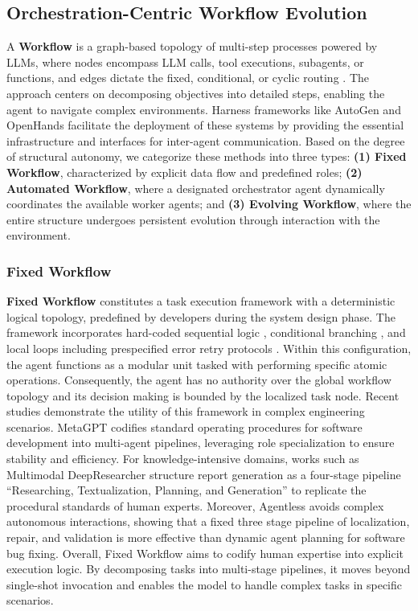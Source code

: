 \documentclass{llmxive}
\begin{document}
\subsection{Orchestration-Centric Workflow Evolution}
\label{sec:agent_evo_agentic_workflow_design}
A \textbf{Workflow} is a graph-based topology of multi-step processes powered by LLMs, where nodes encompass LLM calls, tool executions, subagents, or functions, and edges dictate the fixed, conditional, or cyclic routing \cite{ToT,ReAct,ReWoo,Self-Refine,LLM+P}. The approach centers on decomposing objectives into detailed steps, enabling the agent to navigate complex environments. Harness frameworks like AutoGen  \cite{autogen} and OpenHands \cite{OpenHands} facilitate the deployment of these systems by providing the essential infrastructure and interfaces for inter-agent communication. Based on the degree of structural autonomy, we categorize these methods into three types: \textbf{(1) Fixed Workflow}, characterized by explicit data flow and predefined roles; \textbf{(2) Automated Workflow}, where a designated orchestrator agent dynamically coordinates the available worker agents; and \textbf{(3) Evolving Workflow}, where the entire structure undergoes persistent evolution through interaction with the environment.

\subsubsection{Fixed Workflow}
\label{sec:fixed_workflow}
\textbf{Fixed Workflow} constitutes a task execution framework with a deterministic logical topology, predefined by developers during the system design phase. The framework incorporates hard-coded sequential logic \cite{Explorer, Simulate_Before_Act}, conditional branching \cite{CodeR, VideoAgent}, and local loops including prespecified error retry protocols \cite{LVAgent, QuantAgent}. Within this configuration, the agent functions as a modular unit tasked with performing specific atomic operations. Consequently, the agent has no authority over the global workflow topology and its decision making is bounded by the localized task node. Recent studies demonstrate the utility of this framework in complex engineering scenarios. MetaGPT \cite{METAGPT} codifies standard operating procedures for software development into multi-agent pipelines, leveraging role specialization to ensure stability and efficiency. For knowledge-intensive domains, works such as Multimodal DeepResearcher \cite{Multimodal_DeepResearcher} structure report generation as a four-stage pipeline ``Researching, Textualization, Planning, and Generation'' to replicate the procedural standards of human experts. Moreover, Agentless \cite{Agentless} avoids complex autonomous interactions, showing that a fixed three stage pipeline of localization, repair, and validation is more effective than dynamic agent planning for software bug fixing. Overall, Fixed Workflow aims to codify human expertise into explicit execution logic. By decomposing tasks into multi-stage pipelines, it moves beyond single-shot invocation and enables the model to handle complex tasks in specific scenarios.
\end{document}
